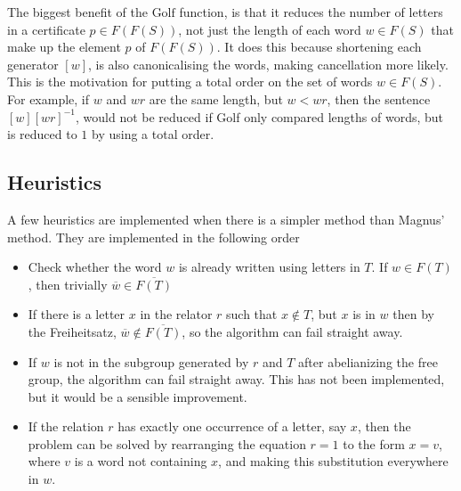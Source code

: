\documentclass[12pt]{article} %
\theoremstyle{definition}
\theoremstyle{definition}
\theoremstyle{definition}
\theoremstyle{definition}
\theoremstyle{definition}
\theoremstyle{definition}
\begin{document}
The biggest benefit of the $\text{Golf}$ function, is that it reduces the number
of letters in a certificate $p \in F(F(S))$, not just the length of each word
$w \in F(S)$ that make up the element $p$ of $F(F(S))$.
It does this because shortening each generator $[w]$, is also
canonicalising the words, making cancellation more likely. This is the motivation
for putting a total order on the set of words $w \in F(S)$.
For example, if $w$ and $wr$ are the same length, but $w < wr$, then
the sentence $[w][wr]^{-1}$, would not be reduced if Golf only compared lengths of words,
but is reduced to $1$ by using a total order.




\subsection{Heuristics}

A few heuristics are implemented when there is a simpler method than Magnus' method.
They are implemented in the following order

\begin{itemize}
  \item Check whether the word $w$ is already written using letters in $T$. If $w \in F(T)$,
  then trivially $\overline{w} \in \overline{F(T)}$

  \item If there is a letter $x$ in the relator $r$ such that $x \notin T$, but
  $x$ is in $w$ then by the Freiheitsatz, $\overline{w} \notin \overline{F(T)}$,
  so the algorithm can fail straight away.

  \item If $w$ is not in the subgroup generated by $r$ and $T$ after abelianizing the free
    group, the algorithm can fail straight away. This has not been implemented, but it would
    be a sensible improvement.

  \item If the relation $r$ has exactly one occurrence of a letter, say $x$, then
    the problem can be solved by rearranging the equation $r = 1$ to the form
    $x = v$, where $v$ is a word not containing $x$, and making this substitution everywhere
    in $w$.
\end{itemize}
\end{document}

